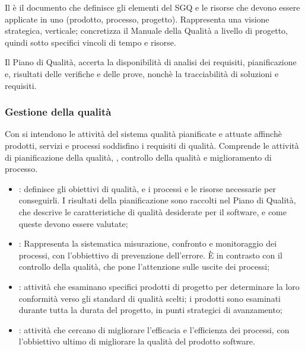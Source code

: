 Il  è il documento che definisce gli elementi del
SGQ e le risorse che devono essere applicate in uno 
(prodotto, processo, progetto). Rappresenta una visione strategica, verticale;
concretizza il Manuale della Qualità a livello di progetto, quindi sotto
specifici vincoli di tempo e risorse.

Il Piano di Qualità, accerta la disponibilità di analisi dei requisiti,
pianificazione e, risultati delle verifiche e delle prove, nonchè la
tracciabilità di soluzioni e requisiti.

\subsubsection{Gestione della qualità}
\label{gestione_della_qualita}

Con  si intendono le attività del sistema qualità
pianificate e attuate affinchè prodotti, servizi e processi soddisfino i
requisiti di qualità. Comprende le attività di pianificazione della qualità,
, controllo della qualità e miglioramento di
processo.

\begin{itemize}
  \item {}: definisce gli obiettivi di qualità,
    e i processi e le risorse necessarie per conseguirli. I risultati della
    pianificazione sono raccolti nel Piano di Qualità, che descrive le
    caratteristiche di qualità desiderate per il software, e come queste devono
    essere valutate;
  \item {}:
    Rappresenta la sistematica misurazione, confronto e monitoraggio dei
    processi, con l'obbiettivo di prevenzione dell'errore. È in contrasto con il
    controllo della qualità, che pone l'attenzione sulle uscite dei processi;
  \item {}: attività che esaminano specifici
    prodotti di progetto per determinare la loro conformità verso gli standard
    di qualità scelti; i prodotti sono esaminati durante tutta la durata del
    progetto, in punti strategici di avanzamento;
  \item {}: attività che cercano di migliorare
    l'efficacia e l'efficienza dei processi, con l'obbiettivo ultimo di
    migliorare la qualità del prodotto software.
\end{itemize}

